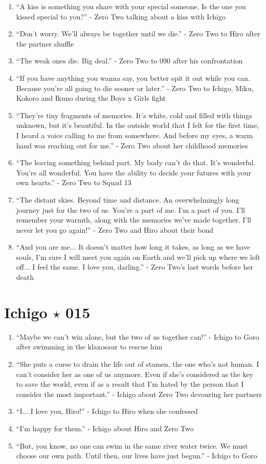 \documentclass{book}
\numberwithin{equation}{section}
\begin{document}
\begin{enumerate}
    \item ``A kiss is something you share with your special someone. Is the one you kissed special to you?'' - Zero Two talking about a kiss with Ichigo
    \item ``Don't worry. We'll always be together until we die.'' - Zero Two to Hiro after the partner shuffle
    \item ``The weak ones die. Big deal.'' - Zero Two to 090 after his confrontation
    \item ``If you have anything you wanna say, you better spit it out while you can. Because you're all going to die sooner or later.'' - Zero Two to Ichigo, Miku, Kokoro and Ikuno during the Boys x Girls fight
    \item ``They're tiny fragments of memories. It's white, cold and filled with things unknown, but it's beautiful. In the outside world that I felt for the first time, I heard a voice calling to me from somewhere. And before my eyes, a warm hand was reaching out for me.'' - Zero Two about her childhood memories
    \item ``The leaving something behind part. My body can't do that. It's wonderful. You're all wonderful. You have the ability to decide your futures with your own hearts.'' - Zero Two to Squad 13
    \item ``The distant skies. Beyond time and distance. An overwhelmingly long journey just for the two of us. You're a part of me. I'm a part of you. I'll remember your warmth, along with the memories we've made together. I'll never let you go again!'' - Zero Two and Hiro about their bond
    \item ``And you are me... It doesn't matter how long it takes, as long as we have souls, I'm sure I will meet you again on Earth and we'll pick up where we left off... I feel the same. I love you, darling.'' - Zero Two's last words before her death 
\end{enumerate}

\section{Ichigo $\star$ 015}
\begin{enumerate}
    \item ``Maybe we can't win alone, but the two of us together can!'' - Ichigo to Goro after swimming in the klaxosaur to rescue him
    \item ``She puts a curse to drain the life out of stamen, the one who's not human. I can't consider her as one of us anymore. Even if she's considered as the key to save the world, even if as a result that I'm hated by the person that I consider the most important.'' - Ichigo about Zero Two devouring her partners
    \item ``I... I love you, Hiro!'' - Ichigo to Hiro when she confessed
    \item ``I'm happy for them.'' - Ichigo about Hiro and Zero Two
    \item ``But, you know, no one can swim in the same river water twice. We must choose our own path. Until then, our lives have just begun.'' - Ichigo to Goro
\end{enumerate}
\end{document}
